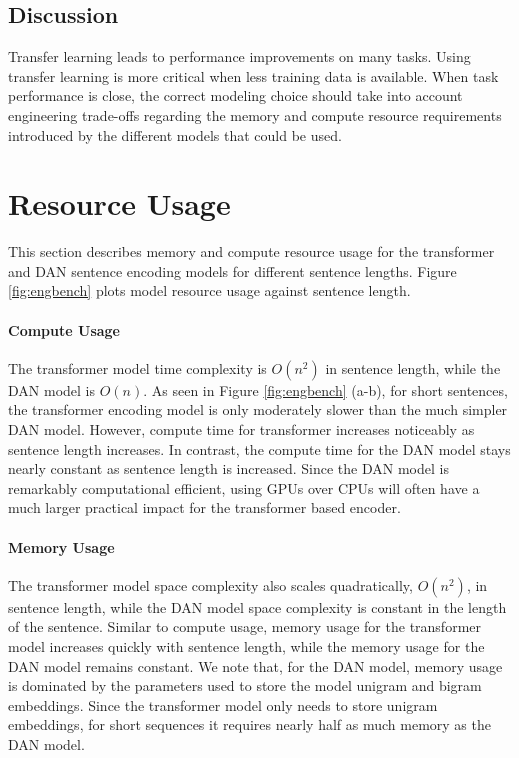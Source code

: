\documentclass[11pt,a4paper]{article}
\begin{document}
\subsection{Discussion}

Transfer learning leads to performance improvements on many tasks. Using transfer learning is more critical when less training data is available. When task performance is close, the correct modeling choice should take into account engineering trade-offs regarding the memory and compute resource requirements introduced by the different models that could be used.  

\section{Resource Usage}

This section describes memory and compute resource usage for the transformer and DAN sentence encoding models for different sentence lengths. Figure \ref{fig:engbench} plots model resource usage against sentence length. 

\paragraph{Compute Usage} The transformer model time complexity is $O(n^2)$ in sentence length, while the DAN model is $O(n)$. As seen in Figure \ref{fig:engbench} (a-b), for short sentences, the transformer encoding model is only moderately slower than the much simpler DAN model. However, compute time for transformer increases noticeably as sentence length increases. In contrast, the compute time for the DAN model stays nearly constant as sentence length is increased. Since the DAN model is remarkably computational efficient, using GPUs over CPUs will often have a much larger practical impact for the transformer based encoder. 

\paragraph{Memory Usage}

The transformer model space complexity also scales quadratically, $O(n^2)$, in sentence length, while the DAN model space complexity is constant in the length of the sentence. Similar to compute usage, memory usage for the transformer model increases quickly with sentence length, while the memory usage for the DAN model remains constant. We note that, for the DAN model, memory usage is dominated by the parameters used to store the model unigram and bigram embeddings. Since the transformer model only needs to store unigram embeddings, for short sequences it requires nearly half as much memory as the DAN model.
\end{document}
